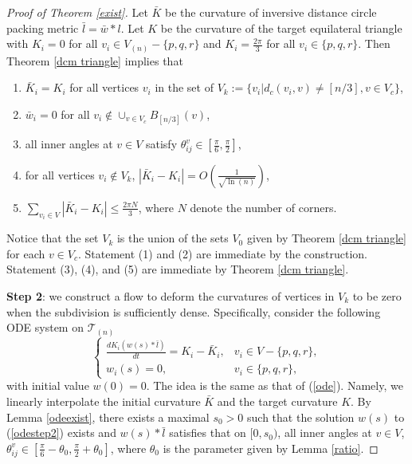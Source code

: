 \documentclass[12pt]{amsart}
\begin{document}
\begin{proof}[Proof of Theorem \ref{exist}]
Let $\bar K$ be the curvature of  inversive distance circle packing metric $\bar l = \bar w*l$.
Let $K$ be the curvature of the target equilateral triangle with $K_i=0$ for all $v_i \in V_{(n)}-\{p,q,r\}$ and $K_i=\frac{2\pi}{3}$ for all $v_i \in \{p,q,r\}$. Then Theorem \ref{dcm triangle} implies that
    \begin{enumerate}
        \item    $\bar K_i = K_i$ for all vertices $v_i$ in the set of $V_k := \{ v_i|{d_c}(v_i,v) \ne [n/3],v \in {V_c}\}$,
        \item  $\bar w_i = 0$ for all $v_i \notin { \cup _{v \in {V_c}}}{B_{[n/3]}}(v)$,
    \item   all inner angles at $v \in {V}$ satisfy $\theta _{ij}^v \in [\frac{\pi }{6},\frac{\pi }{2}]$,
    \item for all vertices $ v_i \notin V_k$, $|{{\bar K}_i} - K_i| = O(\frac{1}{{\sqrt {\ln (n)} }})$,
    \item
        $\sum\limits_{v_i \in V} | {{\bar K}_i} - K_i| \le \frac{2\pi N}{3}$, where $N$ denote the number of corners.
    \end{enumerate}
    Notice that the set $V_k$ is the union of the sets $V_0$ given by Theorem \ref{dcm triangle} for each $v\in V_c$. Statement (1) and (2) are immediate by the construction. Statement (3), (4), and (5) are immediate by Theorem \ref{dcm triangle}.


    \textbf{Step 2}: we construct a flow to deform the curvatures of vertices in $V_k$ to be zero when the subdivision is sufficiently dense. Specifically, consider the following ODE system on $\mathcal{T}_{(n)}$
       \begin{equation} \label{odestep2} \left\{ {\begin{array}{lr}
   			\frac{{d{K_i}(w(s)*\bar l)}}{{dt}} = K_i -  {{{\bar K}_i}} ,& v_i \in V - \{ p,q,r\},\\
   			{w_i}(s) = 0,& v_i \in \{ p,q,r\},
   	\end{array}} \right.
   \end{equation}
    with initial value $w(0) = 0$. The idea  is the same as that of (\ref{ode}). Namely, we linearly interpolate the initial curvature $\bar K$ and the target curvature $K$. By Lemma \ref{odeexist}, there exists a maximal $s_0>0$ such that the solution $w(s)$ to (\ref{odestep2}) exists and $w(s)*\bar l$ satisfies  that  on $[0, s_0)$, all inner angles at $v \in {V}$, $\theta _{ij}^v \in [\frac{\pi }{6} - \theta_0,\frac{\pi}{2} + \theta_0]$, where $\theta_0$ is the parameter given by Lemma \ref{ratio}.





\end{proof}
\end{document}
